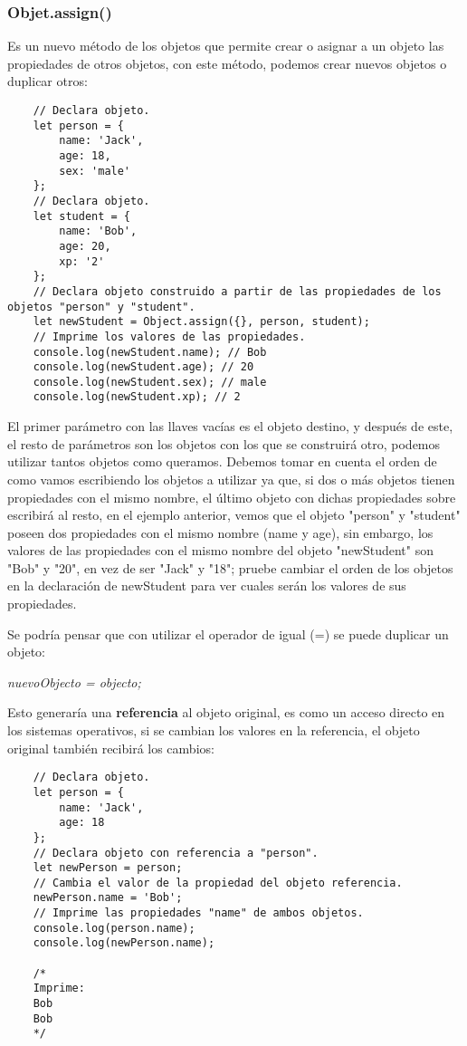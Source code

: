 \subsubsection{Objet.assign()}
\hspace{0.55cm}Es un nuevo método de los objetos que permite crear o asignar a un objeto las propiedades de otros objetos, con este método, podemos crear nuevos objetos o duplicar otros:
\begin{lstlisting}
    // Declara objeto.
    let person = {
        name: 'Jack',
        age: 18,
        sex: 'male'
    };
    // Declara objeto.
    let student = {
        name: 'Bob',
        age: 20,
        xp: '2'
    };
    // Declara objeto construido a partir de las propiedades de los objetos "person" y "student".
    let newStudent = Object.assign({}, person, student);
    // Imprime los valores de las propiedades.
    console.log(newStudent.name); // Bob
    console.log(newStudent.age); // 20
    console.log(newStudent.sex); // male
    console.log(newStudent.xp); // 2
\end{lstlisting}

El primer parámetro con las llaves vacías es el objeto destino, y después de este, el resto de parámetros son los objetos con los que se construirá otro, podemos utilizar tantos objetos como queramos. Debemos tomar en cuenta el orden de como vamos escribiendo los objetos a utilizar ya que, si dos o más objetos tienen propiedades con el mismo nombre, el último objeto con dichas propiedades sobre escribirá al resto, en el ejemplo anterior, vemos que el objeto "person" y "student" poseen dos propiedades con el mismo nombre (name y age), sin embargo, los valores de las propiedades con el mismo nombre del objeto "newStudent" son "Bob" y "20", en vez de ser "Jack" y "18"; pruebe cambiar el orden de los objetos en la declaración de newStudent para ver cuales serán los valores de sus propiedades.

Se podría pensar que con utilizar el operador de igual (=) se puede duplicar un objeto:
\begin{center}
    \textit{nuevoObjecto = objecto;}
\end{center}

Esto generaría una \textbf{referencia} al objeto original, es como un acceso directo en los sistemas operativos, si se cambian los valores en la referencia, el objeto original también recibirá los cambios:
\begin{lstlisting}
    // Declara objeto.
    let person = {
        name: 'Jack',
        age: 18
    };
    // Declara objeto con referencia a "person".
    let newPerson = person;
    // Cambia el valor de la propiedad del objeto referencia.
    newPerson.name = 'Bob';
    // Imprime las propiedades "name" de ambos objetos.
    console.log(person.name);
    console.log(newPerson.name);

    /*
    Imprime:
    Bob
    Bob
    */
\end{lstlisting}

